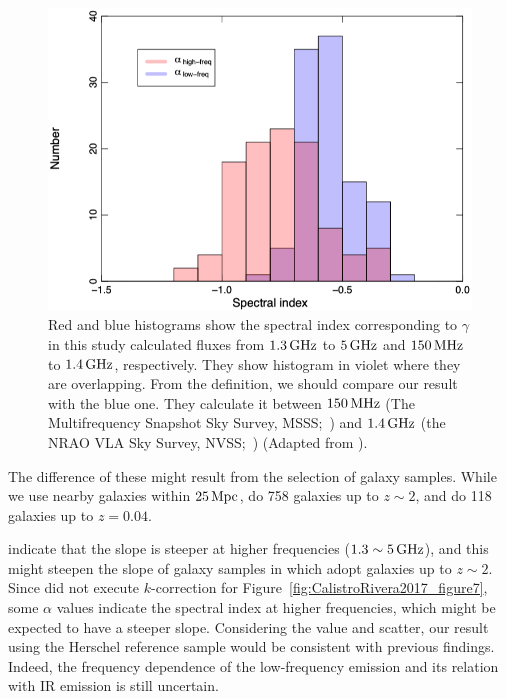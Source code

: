 \begin{figure}[htbp]
	\centering
	\includegraphics[width=.8\linewidth]{Chapter_6/Figures/Chyzy2018_Figure4.png}
    \caption[The histogram of the spectral index in \citet{Chyzy2018}]{\label{fig:Chyzy2018_figure4}
        Red and blue histograms show the spectral index corresponding to $\gamma$ in this study calculated fluxes from $1.3\,\mathrm{GHz}$ to $5\,\mathrm{GHz}$ and $150\,\mathrm{MHz}$ to $1.4\,\mathrm{GHz}$, respectively.
        They show histogram in violet where they are overlapping.
        From the definition, we should compare our result with the blue one.
        They calculate it between $150\,\mathrm{MHz}$ (The Multifrequency Snapshot Sky Survey, MSSS;~\citealt{Heald2015}) and $1.4\,\mathrm{GHz}$ (the NRAO VLA Sky Survey, NVSS;~\citealt{Condon1998})
        (Adapted from \citealt{Chyzy2018}).
    }
\end{figure}

The difference of these might result from the selection of galaxy samples.
While we use nearby galaxies within $25\,\mathrm{Mpc}$, \citet{CalistroRivera2017a} do 758 galaxies up to $z\sim2$, and \citet{Chyzy2018} do 118 galaxies up to $z=0.04$.

\citet{Chyzy2018} indicate that the slope is steeper at higher frequencies ($1.3 \sim 5\,\mathrm{GHz}$), and this might steepen the slope of galaxy samples in \citet{CalistroRivera2017a} which adopt galaxies up to $z\sim2$.
Since \citet{CalistroRivera2017a} did not execute $k$-correction for Figure~\ref{fig:CalistroRivera2017_figure7}, some $\alpha$ values indicate the spectral index at higher frequencies, which might be expected to have a steeper slope.
Considering the value and scatter, our result using the Herschel reference sample would be consistent with previous findings.
Indeed, the frequency dependence of the low-frequency emission and its relation with IR emission is still uncertain.



